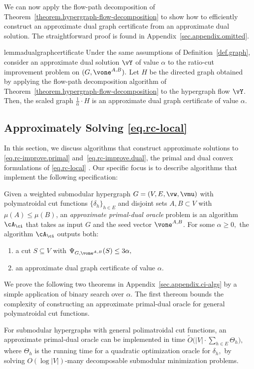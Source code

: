 \documentclass[letterpaper]{article}
\begin{document}
We can now apply the flow-path decomposition of Theorem~\ref{theorem.hypergraph-flow-decomposition} to show how to efficiently construct an approximate dual graph certificate from an approximate dual solution. The straightforward proof is found in Appendix~\ref{sec.appendix.omitted}.
\begin{restatable}{lemma}{dualgraphcertificate}
\label{lem.dual-to-embedding}
Under the same assumptions of Definition~\ref{def.graph}, consider an approximate dual solution $\vY$ of value $\alpha$ to the ratio-cut improvement problem on $(G,\vone^{A,B}).$ Let $H$ be the directed graph obtained by applying the flow-path decomposition algorithm of Theorem~\ref{theorem.hypergraph-flow-decomposition} to the hypergraph flow $\vY$. Then, the scaled graph $\frac{1}{\alpha}\cdot H$ is an approximate dual graph certificate of value $\alpha.$
\end{restatable}
 

\subsection{Approximately Solving \eqref{eq.rc-local}}
\label{sec.solvers}

In this section, we discuss algorithms that construct approximate solutions to \eqref{eq.rc-improve.primal} and~\eqref{eq.rc-improve.dual}, the primal and dual convex formulations of \eqref{eq.rc-local} . Our specific focus is to describe algorithms that implement the following specification:
\begin{definition}
\label{def.oracle}
Given a weighted submodular hypergraph $G = (V,E,\vw, \vmu)$ with polymatroidal cut functions $\{\delta_h\}_{h\in E}$ and disjoint sets $A, B \subset V$ with $\mu(A) \leq \mu(B)$,
an \emph{approximate primal-dual oracle} problem is an algorithm $\cA_{\ci}$ that takes as input $G$ and the seed vector $\vone^{A,B}$.  For some $\alpha \geq 0,$ the algorithm $\cA_{\ci}$ outputs both:
\begin{enumerate}
    \item a cut $S \subseteq V$ with $\Psi_{G,\vone^{A,B}}(S) \leq 3\alpha,$
    \item an approximate dual graph certificate of value $\alpha.$
\end{enumerate}
\end{definition}

We prove the following two theorems in Appendix~\ref{sec.appendix.ci-algs} by a simple application of binary search over  $\alpha.$
The first thereom bounds the complexity of constructing an approximate primal-dual oracle for general polymatroidal cut functions.
\begin{theorem}
\label{thm.general-solver}
For submodular hypergraphs with general polimatroidal cut functions, an approximate primal-dual oracle can be implemented in time $\tilde{O}\big( |V|\cdot\sum_{h\in E}\Theta_{h}\big),$
where $\Theta_h$ is the running time for a quadratic optimization oracle for $\delta_h,$ by solving $O(\log |V|)$-many decomposable submodular minimization problems.
\end{theorem}
\end{document}
